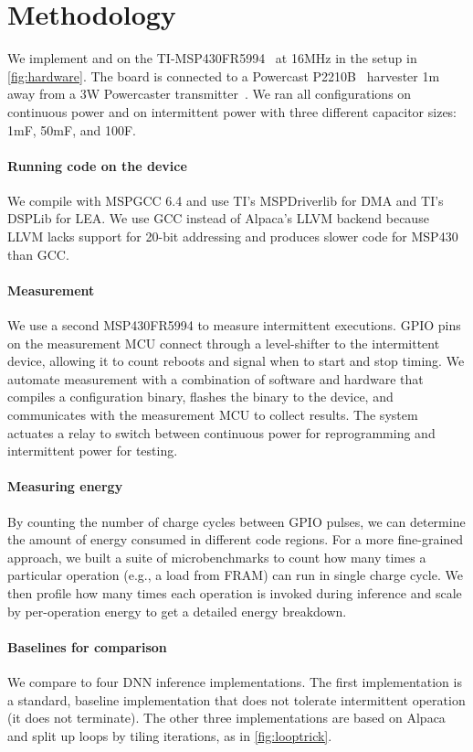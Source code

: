 \section{Methodology}
\label{sec:methodology}

We implement \sonic and \tails on the TI-MSP430FR5994~\cite{msp430fr5994} at
16MHz in the setup in \autoref{fig:hardware}.
The board is connected to a
Powercast P2210B~\cite{powercastboard} harvester 1m away from a 3W Powercaster
transmitter~\cite{powercasttransmitter}. We ran all configurations on
continuous power and on intermittent power with three different capacitor
sizes: 1mF, 50mF, and 100\textmu F.

\figSONICMethod

\figSONICEvalTime

\paragraph{Running code on the device}
We compile with MSPGCC 6.4 and use TI's MSPDriverlib for DMA and TI's DSPLib
for LEA. We use GCC instead of Alpaca's LLVM backend because LLVM lacks support
for 20-bit addressing and produces slower code for MSP430 than GCC.

\paragraph{Measurement}
We use a second MSP430FR5994 to measure intermittent executions.
%
GPIO pins on the measurement MCU connect through a level-shifter to the
intermittent device, allowing it to count reboots and signal when to start and
stop timing.
%
We automate measurement with a combination of software and hardware that
compiles a configuration binary, flashes the binary to the device, and
communicates with the measurement MCU to collect results.
%
The system actuates a relay to switch between continuous power for reprogramming
and intermittent power for testing.

\paragraph{Measuring energy}
By counting the number of charge cycles between GPIO pulses, we can determine
the amount of energy consumed in different code regions.
%
For a more fine-grained approach, we built a suite of 
microbenchmarks to count how many times a particular operation (e.g., a load from FRAM) can run in single charge cycle.
%
We then profile how many times each operation is invoked during inference
and scale by per-operation energy to get a detailed energy breakdown.

\paragraph{Baselines for comparison}
We compare \sonictails to four DNN inference implementations. The first
implementation is a standard, baseline implementation that does not tolerate
intermittent operation (it does not terminate).
The other three implementations are based on
Alpaca~\cite{alpaca} and split up loops by tiling iterations, as in \autoref{fig:looptrick}.
